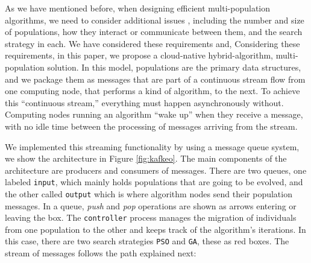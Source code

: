 \documentclass[runningheads]{llncs}
\begin{document}
As we have mentioned before, when designing efficient multi-population
algorithms, we need to consider additional issues \cite{Ma2019},
including the number and size of populations, how they interact or
communicate between them, and the search strategy in each.
We have considered these requirements and, Considering these requirements, 
in this paper, we propose a cloud-native hybrid-algorithm, multi-population solution.
In this model, populations are the primary data structures,
and we package them as messages that are part of a continuous stream
flow from one computing node, that performs a kind of algorithm, to
the next. To achieve this ``continuous stream,'' everything must
happen asynchronously without. Computing nodes running an algorithm
``wake up'' when they receive a message, with no idle time between the
processing of messages arriving from the stream.

We implemented this streaming functionality by using a message
queue system, we show the architecture in Figure
\ref{fig:kafkeo}. The main components of the architecture are 
producers and consumers of messages. There are two queues, one labeled
\texttt{input}, which mainly holds populations that are going to be
evolved, and the other called \texttt{output} which is where algorithm
nodes send their population messages. In a queue, {\em push} and {\em pop}
operations are shown as arrows entering or leaving the box. 
The \texttt{controller} process manages the migration 
of individuals from one population to the other and keeps 
track of the algorithm's iterations. 
In this case, there are two search strategies \texttt{PSO} and \texttt{GA},
these as red boxes. The stream of messages follows the path explained next:
\end{document}
